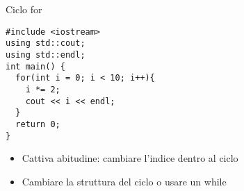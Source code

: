 \begin{frame}[fragile]{Ciclo for}
  \vfill
  \begin{lstlisting}
#include <iostream>
using std::cout;
using std::endl;
int main() {
  for(int i = 0; i < 10; i++){
    i *= 2;
    cout << i << endl;
  }
  return 0;
}
  \end{lstlisting}
  \vfill
  \begin{itemize}
    \item Cattiva abitudine: cambiare l'indice dentro al ciclo
    \vfill
    \item Cambiare la struttura del ciclo o usare un while
  \end{itemize}
  \vfill
\end{frame}
